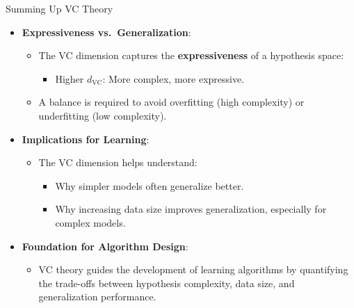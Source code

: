\documentclass[
  ignorenonframetext,
]{beamer}
\providecommand{\tightlist}{%
  \setlength{\itemsep}{0pt}\setlength{\parskip}{0pt}}\usepackage{longtable,booktabs,array}
\begin{document}
\begin{frame}{Summing Up VC Theory}
\label{summing-up-vc-theory}
\begin{itemize}
\tightlist
\item
  \textbf{Expressiveness vs.~Generalization}:

  \begin{itemize}
  \tightlist
  \item
    The VC dimension captures the \textbf{expressiveness} of a
    hypothesis space:

    \begin{itemize}
    \tightlist
    \item
      Higher \(d_{\text{VC}}\): More complex, more expressive.
    \end{itemize}
  \item
    A balance is required to avoid overfitting (high complexity) or
    underfitting (low complexity).
  \end{itemize}
\item
  \textbf{Implications for Learning}:

  \begin{itemize}
  \tightlist
  \item
    The VC dimension helps understand:

    \begin{itemize}
    \tightlist
    \item
      Why simpler models often generalize better.
    \item
      Why increasing data size improves generalization, especially for
      complex models.
    \end{itemize}
  \end{itemize}
\item
  \textbf{Foundation for Algorithm Design}:

  \begin{itemize}
  \tightlist
  \item
    VC theory guides the development of learning algorithms by
    quantifying the trade-offs between hypothesis complexity, data size,
    and generalization performance.
  \end{itemize}
\end{itemize}
\end{frame}
\end{document}

